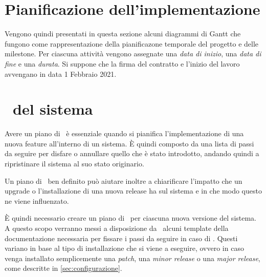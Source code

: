 \newpage
\section{Pianificazione dell'implementazione}\label{sec:pianificazione}

	Vengono quindi presentati in questa sezione alcuni diagrammi di Gantt che fungono come rappresentazione della pianificazone temporale del progetto e delle milestone.
	Per ciascuna attività vengono assegnate una \textit{data di inizio}, una \textit{data di fine} e una \textit{durata}.
	Si suppone che la firma del contratto e l'inizio del lavoro avvengano in data 1 Febbraio 2021.
	
	
	
	
\newpage
\section{\rollback~del sistema}


	Avere un piano di \rollback~è essenziale quando si pianifica l'implementazione di una nuova feature all'interno di un sistema.
	È quindi composto da una lista di passi da seguire per disfare o annullare quello che è stato introdotto, andando quindi a ripristinare il sistema al suo stato originario.
	
	Un piano di \rollback~ben definito può aiutare inoltre a chiarificare l'impatto che un upgrade o l'installazione di una nuova release ha sul sistema e in che modo questo ne viene influenzato.

	È quindi necessario creare un piano di \rollback~per ciascuna nuova versione del sistema.
	A questo scopo verranno messi a disposizione da \azienda~alcuni template della documentazione necessaria per fissare i passi da seguire in caso di \rollback.
	Questi variano in base al tipo di installazione che si viene a eseguire, ovvero in caso venga installato semplicemente una \textit{patch}, una \textit{minor release} o una \textit{major release}, come descritte in \ref{sec:configurazione}.
	

